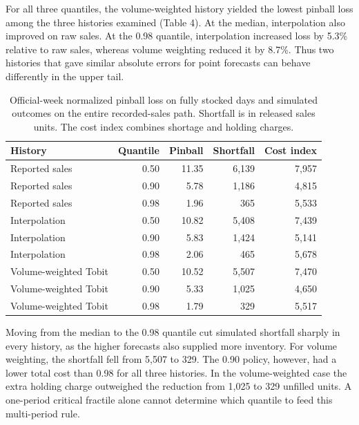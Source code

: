\documentclass[11pt,a4paper]{article}
\begin{document}
For all three quantiles, the volume-weighted history yielded the lowest pinball loss among the three histories examined (Table 4). At the median, interpolation also improved on raw sales. At the 0.98 quantile, interpolation increased loss by 5.3\% relative to raw sales, whereas volume weighting reduced it by 8.7\%. Thus two histories that gave similar absolute errors for point forecasts can behave differently in the upper tail.

\begin{table}[htbp]\centering\small
\caption{Official-week normalized pinball loss on fully stocked days and simulated outcomes on the entire recorded-sales path. Shortfall is in released sales units. The cost index combines shortage and holding charges.}


\begin{tabular}{@{}lrrrr@{}}\toprule

History & Quantile & Pinball & Shortfall & Cost index \\

\midrule

Reported sales & 0.50 & 11.35 & 6,139 & 7,957 \\

Reported sales & 0.90 & 5.78 & 1,186 & 4,815 \\

Reported sales & 0.98 & 1.96 & 365 & 5,533 \\

Interpolation & 0.50 & 10.82 & 5,408 & 7,439 \\

Interpolation & 0.90 & 5.83 & 1,424 & 5,141 \\

Interpolation & 0.98 & 2.06 & 465 & 5,678 \\

Volume-weighted Tobit & 0.50 & 10.52 & 5,507 & 7,470 \\

Volume-weighted Tobit & 0.90 & 5.33 & 1,025 & 4,650 \\

Volume-weighted Tobit & 0.98 & 1.79 & 329 & 5,517 \\

\bottomrule\end{tabular}\end{table}

Moving from the median to the 0.98 quantile cut simulated shortfall sharply in every history, as the higher forecasts also supplied more inventory. For volume weighting, the shortfall fell from 5,507 to 329. The 0.90 policy, however, had a lower total cost than 0.98 for all three histories. In the volume-weighted case the extra holding charge outweighed the reduction from 1,025 to 329 unfilled units. A one-period critical fractile alone cannot determine which quantile to feed this multi-period rule.
\end{document}
